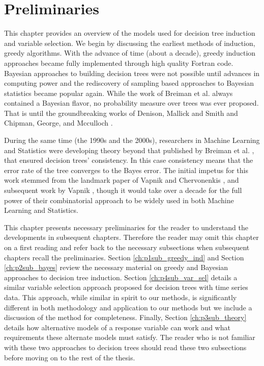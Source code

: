\chapter{Preliminaries}
\label{ch:preliminaries}
This chapter provides an overview of the models used for decision tree induction and variable selection. We begin by discussing the earliest methods of induction, greedy algorithms. With the advance of time (about a decade), greedy induction approaches became fully implemented through high quality Fortran code. Bayesian approaches to building decision trees were not possible until advances in computing power and the rediscovery of sampling based approaches to Bayesian statistics became popular again. While the work of Breiman et al. \cite{breiman1984classification} always contained a Bayesian flavor, no probability measure over trees was ever proposed. That is until the groundbreaking works of Denison, Mallick and Smith \cite{denison1998bayesian} and Chipman, George, and Mcculloch \cite{chipman1998bayesian}.

 During the same time (the 1990s and the 2000s), researchers in Machine Learning and Statistics were developing theory beyond that published by Breiman et al. \cite{breiman1984classification}, that ensured decision trees' consistency. In this case consistency means that the error rate of the tree converges to the Bayes error. The initial impetus for this work stemmed from the landmark paper of Vapnik and Chervonenkis \cite{vapnik1971uniform}, and subsequent work by Vapnik \cite{vapnik2000nature}, though it would take over a decade for the full power of their combinatorial approach to be widely used in both Machine Learning and Statistics. 

This chapter presents necessary preliminaries for the reader to understand the developments in subsequent chapters. Therefore the reader may omit this chapter on a first reading and refer back to the necessary subsections when subsequent chapters recall the preliminaries. Section \ref{ch:p1sub_greedy_ind} and Section \ref{ch:p2sub_bayes} review the necessary material on greedy and Bayesian approaches to decision tree induction. Section \ref{ch:p4sub_var_sel} details a similar variable selection approach proposed for decision trees with time series data. This approach, while similar in spirit to our methods, is significantly different in both methodology and application to our methods but we include a discussion of the method for completeness. Finally, Section \ref{ch:p3sub_theory} details how alternative models of a response variable can work and what requirements these alternate models must satisfy. The reader who is not familiar with these two approaches to decision trees should read these two subsections before moving on to the rest of the thesis.  

